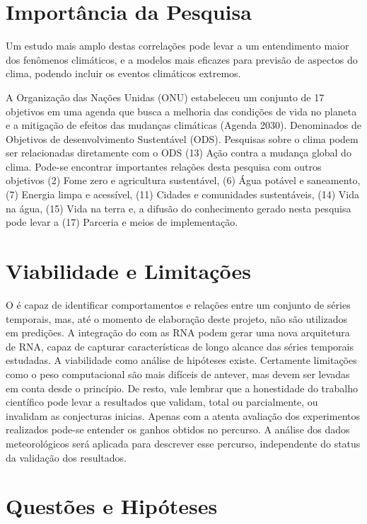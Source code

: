 \section{Importância da Pesquisa}
\label{sec:justificativa}

Um estudo mais amplo destas correlações pode levar a um entendimento maior dos fenômenos climáticos, e a modelos mais eficazes para previsão de aspectos do clima, podendo incluir os eventos climáticos extremos. 

A Organização das Nações Unidas (ONU) estabeleceu um conjunto de 17 objetivos em uma agenda que busca a melhoria das condições de vida no planeta e a mitigação de efeitos das mudanças climáticas (Agenda 2030). Denominados de Objetivos de desenvolvimento Sustentável (ODS). Pesquisas sobre o clima podem ser relacionadas diretamente com o ODS (13) Ação contra a mudança global do clima. Pode-se  encontrar importantes relações desta pesquisa com outros objetivos (2) Fome zero e agricultura sustentável, (6) Água potável e saneamento, (7) Energia limpa e acessível, (11) Cidades e comunidades sustentáveis, (14) Vida na água, (15) Vida na terra e, a difusão do conhecimento gerado nesta pesquisa pode levar a (17) Parceria e meios de implementação.

\section{Viabilidade e Limitações}
\label{sec:limites}

O \dmc é capaz de identificar comportamentos e relações entre um conjunto de séries temporais, mas, até o momento de elaboração deste projeto, não são utilizados em predições. A integração do \dmc com as RNA podem gerar uma nova arquitetura de RNA, capaz de capturar características de longo alcance das séries temporais estudadas. 
A viabilidade como análise de hipóteses existe. Certamente limitações como o peso computacional são mais difíceis de antever, mas devem ser levadas em
conta desde o princípio.
De resto, vale lembrar que a honestidade do trabalho científico pode levar a resultados que validam, total ou parcialmente, ou invalidam as conjecturas inicias. Apenas com a atenta avaliação dos experimentos realizados pode-se entender os ganhos obtidos no percurso. A análise dos dados meteorológicos será aplicada para descrever esse percurso, independente do status da validação dos resultados.

\section{Questões e Hipóteses}
\label{sec:questoes}

